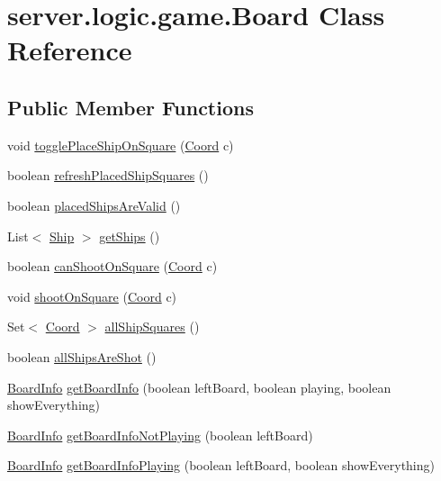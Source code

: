 \hypertarget{classserver_1_1logic_1_1game_1_1_board}{}\section{server.\+logic.\+game.\+Board Class Reference}
\label{classserver_1_1logic_1_1game_1_1_board}
\subsection*{Public Member Functions}
\begin{DoxyCompactItemize}
\item 
void \hyperlink{classserver_1_1logic_1_1game_1_1_board_af74b65d15f58535175cba5586116e5ef}{toggle\+Place\+Ship\+On\+Square} (\hyperlink{classsharedlib_1_1utils_1_1_coord}{Coord} c)
\item 
boolean \hyperlink{classserver_1_1logic_1_1game_1_1_board_a5e92f382c9a8f31b78c43ed70feb9f48}{refresh\+Placed\+Ship\+Squares} ()
\item 
boolean \hyperlink{classserver_1_1logic_1_1game_1_1_board_a84f0eed1bfb61878ff62ba2ce1249048}{placed\+Ships\+Are\+Valid} ()
\item 
List$<$ \hyperlink{classserver_1_1logic_1_1game_1_1_ship}{Ship} $>$ \hyperlink{classserver_1_1logic_1_1game_1_1_board_adaf9b78ef262a7916d34c5a1817d8915}{get\+Ships} ()
\item 
boolean \hyperlink{classserver_1_1logic_1_1game_1_1_board_a712480f632538d25735956557c21abad}{can\+Shoot\+On\+Square} (\hyperlink{classsharedlib_1_1utils_1_1_coord}{Coord} c)
\item 
void \hyperlink{classserver_1_1logic_1_1game_1_1_board_abcacddd3a6d0e781fb3c39408c6f2720}{shoot\+On\+Square} (\hyperlink{classsharedlib_1_1utils_1_1_coord}{Coord} c)
\item 
Set$<$ \hyperlink{classsharedlib_1_1utils_1_1_coord}{Coord} $>$ \hyperlink{classserver_1_1logic_1_1game_1_1_board_ab83f640a1a737762190a65d7486b86dc}{all\+Ship\+Squares} ()
\item 
boolean \hyperlink{classserver_1_1logic_1_1game_1_1_board_a1494f4cde8adcae437b6bbec8480c7cf}{all\+Ships\+Are\+Shot} ()
\item 
\hyperlink{classsharedlib_1_1tuples_1_1_board_info}{Board\+Info} \hyperlink{classserver_1_1logic_1_1game_1_1_board_a089704355e9f5ee22651d7a410b0ca1e}{get\+Board\+Info} (boolean left\+Board, boolean playing, boolean show\+Everything)
\item 
\hyperlink{classsharedlib_1_1tuples_1_1_board_info}{Board\+Info} \hyperlink{classserver_1_1logic_1_1game_1_1_board_a06057751106c2876a164c664e5bf3d26}{get\+Board\+Info\+Not\+Playing} (boolean left\+Board)
\item 
\hyperlink{classsharedlib_1_1tuples_1_1_board_info}{Board\+Info} \hyperlink{classserver_1_1logic_1_1game_1_1_board_abefb8ce9f95462573d3613a4bbda3c99}{get\+Board\+Info\+Playing} (boolean left\+Board, boolean show\+Everything)
\end{DoxyCompactItemize}


